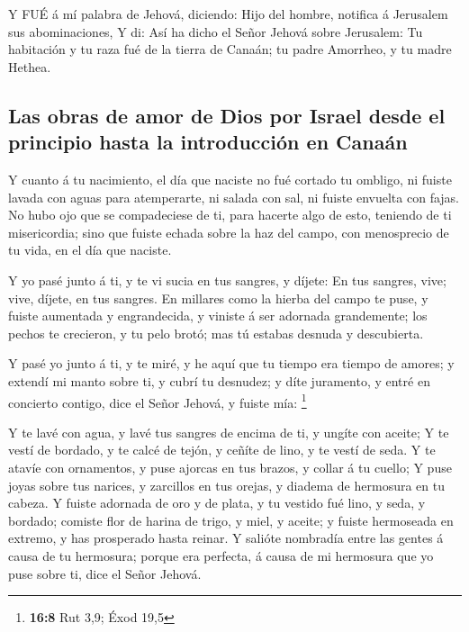  Y FUÉ á mí palabra de Jehová, diciendo:  Hijo
del hombre, notifica á Jerusalem sus abominaciones,  Y di:
Así ha dicho el Señor Jehová sobre Jerusalem: Tu habitación y tu raza
fué de la tierra de Canaán; tu padre Amorrheo, y tu madre Hethea.

\hypertarget{las-obras-de-amor-de-dios-por-israel-desde-el-principio-hasta-la-introducciuxf3n-en-canauxe1n}{%
\subsection{Las obras de amor de Dios por Israel desde el principio
hasta la introducción en
Canaán}\label{las-obras-de-amor-de-dios-por-israel-desde-el-principio-hasta-la-introducciuxf3n-en-canauxe1n}}

 Y cuanto á tu nacimiento, el día que naciste no fué cortado
tu ombligo, ni fuiste lavada con aguas para atemperarte, ni salada con
sal, ni fuiste envuelta con fajas.  No hubo ojo que se
compadeciese de ti, para hacerte algo de esto, teniendo de ti
misericordia; sino que fuiste echada sobre la haz del campo, con
menosprecio de tu vida, en el día que naciste.

 Y yo pasé junto á ti, y te vi sucia en tus sangres, y
díjete: En tus sangres, vive; vive, díjete, en tus sangres. 
En millares como la hierba del campo te puse, y fuiste aumentada y
engrandecida, y viniste á ser adornada grandemente; los pechos te
crecieron, y tu pelo brotó; mas tú estabas desnuda y descubierta.

 Y pasé yo junto á ti, y te miré, y he aquí que tu tiempo
era tiempo de amores; y extendí mi manto sobre ti, y cubrí tu desnudez;
y díte juramento, y entré en concierto contigo, dice el Señor Jehová, y
fuiste mía: \footnote{\textbf{16:8} Rut 3,9; Éxod 19,5}

 Y te lavé con agua, y lavé tus sangres de encima de ti, y
ungíte con aceite;  Y te vestí de bordado, y te calcé de
tejón, y ceñíte de lino, y te vestí de seda.  Y te atavíe
con ornamentos, y puse ajorcas en tus brazos, y collar á tu cuello;
 Y puse joyas sobre tus narices, y zarcillos en tus orejas,
y diadema de hermosura en tu cabeza.  Y fuiste adornada de
oro y de plata, y tu vestido fué lino, y seda, y bordado; comiste flor
de harina de trigo, y miel, y aceite; y fuiste hermoseada en extremo, y
has prosperado hasta reinar.  Y salióte nombradía entre las
gentes á causa de tu hermosura; porque era perfecta, á causa de mi
hermosura que yo puse sobre ti, dice el Señor Jehová.

